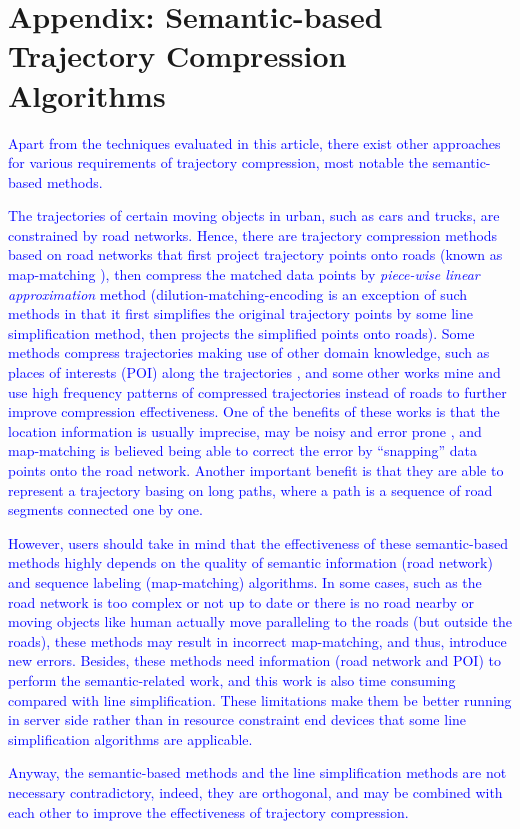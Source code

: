 \section*{{Appendix: Semantic-based Trajectory Compression Algorithms}}
\textcolor{blue}{Apart from the techniques evaluated in this article, there exist other approaches for various requirements of trajectory compression, most notable the semantic-based methods.}

\textcolor{blue}{The trajectories of certain moving objects in urban, such as cars and trucks, are constrained by road networks. Hence, there are trajectory compression methods based on road networks \cite{Chen:Trajectory, Popa:Spatio,Civilis:Techniques,Hung:Clustering, Kellaris:Map, Song:PRESS, Han:Compress, Cao:Road} that first project trajectory points onto roads (known as map-matching \cite{Quddus:MapMatching}), then compress the matched data points by \emph{piece-wise linear approximation} method \cite{Elmeleegy:Stream, Xie:Stream,Luo:Streaming,ORourke:Fitting} (dilution-matching-encoding \cite{Gotsman:Compaction} is an exception of such methods in that it first simplifies the original trajectory points by some line simplification method, then projects the simplified points onto roads).}
%
\textcolor{blue}{Some methods \cite{Schmid:Semantic, Richter:Semantic} compress trajectories making use of other domain knowledge, such as places of interests (POI) along the trajectories \cite{Richter:Semantic}, and some other works \cite{Gotsman:Compaction, Song:PRESS, Han:Compress,Koide:CiNCT} mine and use high frequency patterns of compressed trajectories instead of roads to further improve compression effectiveness.}
%
\textcolor{blue}{One of the benefits of these works is that the location information is usually imprecise, may be noisy and error prone \cite{Cao:Road}, and map-matching is believed being able to correct the error by “snapping” data points onto the road network.
Another important benefit is that they are able to represent a trajectory basing on long paths, where a path is a sequence of road segments connected one by one.}

\textcolor{blue}{However, users should take in mind that the effectiveness of these semantic-based methods highly depends on the quality of semantic information (\eg road network) and sequence labeling (\eg map-matching) algorithms. In some cases, such as the road network is too complex or not up to date or there is no road nearby or moving objects like human actually move paralleling to the roads (but outside the roads), these methods may result in incorrect map-matching, and thus, introduce new errors.}
\textcolor{blue}{Besides, these methods need information (\eg road network and POI) to perform the semantic-related work, and this work is also time consuming compared with line simplification. These limitations make them be better running in server side rather than in resource constraint end devices that some line simplification algorithms are applicable.}

\textcolor{blue}{Anyway, the semantic-based methods and the line simplification methods are not necessary contradictory, indeed, they are orthogonal, and may be combined with each other to improve the effectiveness of trajectory compression.}



